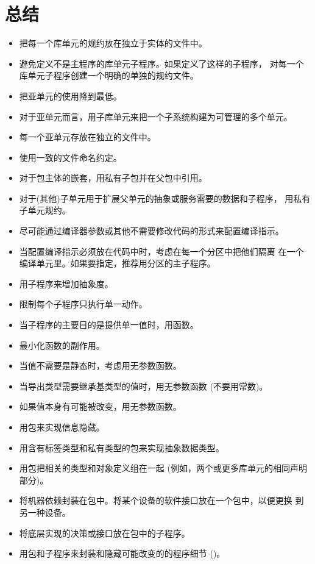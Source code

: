 %
%
%

\section{总结}
\begin{itemize}
\item 把每一个库单元的规约放在独立于实体的文件中。
\item 避免定义不是主程序的库单元子程序。如果定义了这样的子程序，
对每一个库单元子程序创建一个明确的单独的规约文件。
\item 把亚单元的使用降到最低。
\item 对于亚单元而言，用子库单元来把一个子系统构建为可管理的多个单元。
\item 每一个亚单元存放在独立的文件中。
\item 使用一致的文件命名约定。
\item 对于包主体的嵌套，用私有子包并在父包中引用。
\item 对于(其他)子单元用于扩展父单元的抽象或服务需要的数据和子程序，
 用私有子单元规约。

\item 尽可能通过编译器参数或其他不需要修改代码的形式来配置编译指示。
\item 当配置编译指示必须放在代码中时，考虑在每一个分区中把他们隔离
在一个编译单元里。如果要指定，推荐用分区的主子程序。

\item 用子程序来增加抽象度。
\item 限制每个子程序只执行单一动作。

\item 当子程序的主要目的是提供单一值时，用函数。
\item 最小化函数的副作用。
\item 当值不需要是静态时，考虑用无参数函数。
\item 当导出类型需要继承基类型的值时，用无参数函数 (不要用常数)。
\item 如果值本身有可能被改变，用无参数函数。

\item 用包来实现信息隐藏。
\item 用含有标签类型和私有类型的包来实现抽象数据类型。
\item 用包把相关的类型和对象定义组在一起
      (例如，两个或更多库单元的相同声明部分)。
\item 将机器依赖封装在包中。将某个设备的软件接口放在一个包中，以便更换
到另一种设备。
\item 将底层实现的决策或接口放在包中的子程序。
\item 用包和子程序来封装和隐藏可能改变的的程序细节 (\cite{nissen84})。
\end{itemize}
